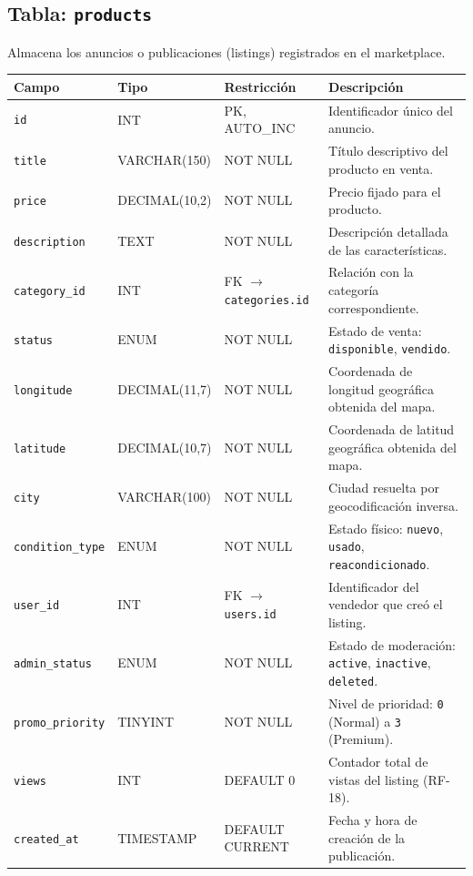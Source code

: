 \documentclass[11pt,a4paper]{report}
\begin{document}
\subsection{Tabla: \texttt{products}}
Almacena los anuncios o publicaciones (listings) registrados en el marketplace.
\begin{table}[H]
\centering
\begin{tabularx}{\textwidth}{|l|l|l|L|}
\hline
{}\textbf{Campo} & \textbf{Tipo} & \textbf{Restricción} & \textbf{Descripción} \\ \hline
\texttt{id} & INT & PK, AUTO\_INC & Identificador único del anuncio. \\ \hline
\texttt{title} & VARCHAR(150) & NOT NULL & Título descriptivo del producto en venta. \\ \hline
\texttt{price} & DECIMAL(10,2) & NOT NULL & Precio fijado para el producto. \\ \hline
\texttt{description} & TEXT & NOT NULL & Descripción detallada de las características. \\ \hline
\texttt{category\_id} & INT & FK $\rightarrow$ \texttt{categories.id} & Relación con la categoría correspondiente. \\ \hline
\texttt{status} & ENUM & NOT NULL & Estado de venta: \texttt{disponible}, \texttt{vendido}. \\ \hline
\texttt{longitude} & DECIMAL(11,7) & NOT NULL & Coordenada de longitud geográfica obtenida del mapa. \\ \hline
\texttt{latitude} & DECIMAL(10,7) & NOT NULL & Coordenada de latitud geográfica obtenida del mapa. \\ \hline
\texttt{city} & VARCHAR(100) & NOT NULL & Ciudad resuelta por geocodificación inversa. \\ \hline
\texttt{condition\_type} & ENUM & NOT NULL & Estado físico: \texttt{nuevo}, \texttt{usado}, \texttt{reacondicionado}. \\ \hline
\texttt{user\_id} & INT & FK $\rightarrow$ \texttt{users.id} & Identificador del vendedor que creó el listing. \\ \hline
\texttt{admin\_status} & ENUM & NOT NULL & Estado de moderación: \texttt{active}, \texttt{inactive}, \texttt{deleted}. \\ \hline
\texttt{promo\_priority} & TINYINT & NOT NULL & Nivel de prioridad: \texttt{0} (Normal) a \texttt{3} (Premium). \\ \hline
\texttt{views} & INT & DEFAULT 0 & Contador total de vistas del listing (RF-18). \\ \hline
\texttt{created\_at} & TIMESTAMP & DEFAULT CURRENT & Fecha y hora de creación de la publicación. \\ \hline
\end{tabularx}
\end{table}
\end{document}
